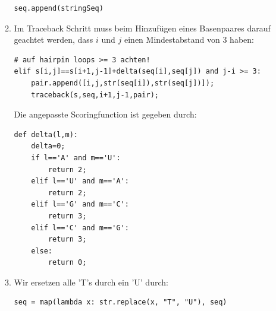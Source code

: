 \documentclass{homework}
\begin{document}
\begin{enumerate}
\begin{enumerate}
\begin{verbatim}
seq.append(stringSeq)
\end{verbatim}
\item
Im Traceback Schritt muss beim Hinzufügen eines Basenpaares darauf geachtet werden, dass $i$ und $j$ einen Mindestabstand von 3 haben:
\begin{verbatim}
# auf hairpin loops >= 3 achten!
elif s[i,j]==s[i+1,j-1]+delta(seq[i],seq[j]) and j-i >= 3:
    pair.append([i,j,str(seq[i]),str(seq[j])]);
    traceback(s,seq,i+1,j-1,pair);
\end{verbatim}
Die angepasste Scoringfunction ist gegeben durch:
\begin{verbatim}
def delta(l,m):
    delta=0;
    if l=='A' and m=='U':
        return 2;
    elif l=='U' and m=='A':
        return 2;
    elif l=='G' and m=='C':
        return 3;
    elif l=='C' and m=='G':
        return 3;
    else:
        return 0;
\end{verbatim}

\item
Wir ersetzen alle 'T's durch ein 'U' durch:
\begin{verbatim}
seq = map(lambda x: str.replace(x, "T", "U"), seq)
\end{verbatim}


\end{enumerate}
\end{enumerate}
\end{document}
